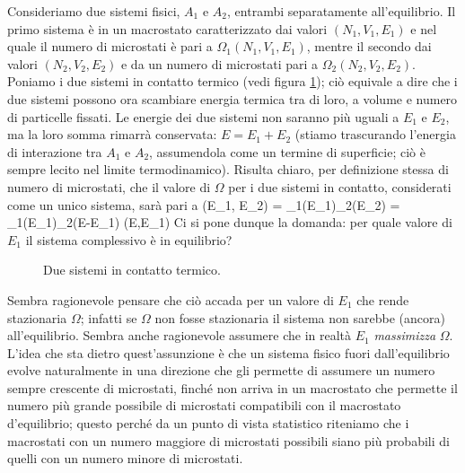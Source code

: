 Consideriamo due sistemi fisici, $A_{1}$ e $A_{2}$, entrambi separatamente all'equilibrio. Il primo sistema è in un macrostato caratterizzato dai valori $(N_{1},V_{1},E_{1})$ e nel quale il numero di microstati è pari a $\Omega_{1}(N_{1},V_{1},E_{1})$, mentre il secondo dai valori $(N_{2},V_{2},E_{2})$ e da un numero di microstati pari a $\Omega_{2}(N_{2},V_{2},E_{2})$. Poniamo i due sistemi in contatto termico (vedi figura \ref{fig:a1a2}); ciò equivale a dire che i due sistemi possono ora scambiare energia termica tra di loro, a volume e numero di particelle fissati. Le energie dei due sistemi non saranno più uguali a $E_{1}$ e $E_{2}$, ma la loro somma rimarrà conservata: $E = E_{1} + E_{2}$ (stiamo trascurando l'energia di interazione tra $A_{1}$ e $A_{2}$, assumendola come un termine di superficie; ciò è sempre lecito nel limite termodinamico). Risulta chiaro, per definizione stessa di numero di microstati, che il valore di $\Omega$ per i due sistemi in contatto, considerati come un unico sistema, sarà pari a
\be
\label{eq:omega}
\Omega(E_{1}, E_{2}) = \Omega_{1}(E_{1})\Omega_{2}(E_{2}) = \Omega_{1}(E_{1})\Omega_{2}(E-E_{1}) \equiv \Omega(E,E_{1})
\ee
Ci si pone dunque la domanda: per quale valore di $E_{1}$ il sistema complessivo è in equilibrio?

\begin{figure}[!ht]
  \centering
  
  \caption{Due sistemi in contatto termico.}
  \label{fig:a1a2}
\end{figure}

Sembra ragionevole pensare che ciò accada per un valore di $E_1$ che rende stazionaria $\Omega$; infatti se $\Omega$ non fosse stazionaria il sistema non sarebbe (ancora) all'equilibrio. Sembra anche ragionevole assumere che in realtà $E_{1}$ {\em massimizza} $\Omega$. L'idea che sta dietro quest'assunzione è che un sistema fisico fuori dall'equilibrio evolve naturalmente in una direzione che gli permette di assumere un numero sempre crescente di microstati, finché non arriva in un macrostato che permette il numero più grande possibile di microstati compatibili con il macrostato d'equilibrio; questo perché da un punto di vista statistico riteniamo che i macrostati con un numero maggiore di microstati possibili siano più probabili di quelli con un numero minore di microstati.

